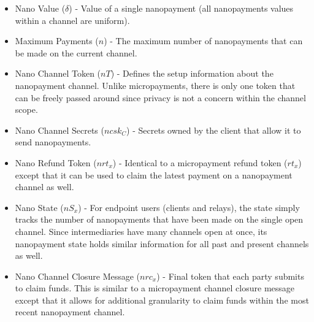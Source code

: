 \documentclass{article}
\begin{document}
\begin{itemize}
\item Nano Value ($\delta$) - Value of a single nanopayment (all
  nanopayments values within a channel are uniform).
\item Maximum Payments ($n$) - The maximum number of nanopayments that
  can be made on the current channel.
\item Nano Channel Token ($nT$) - Defines the setup information about
  the nanopayment channel. Unlike micropayments, there is only one
  token that can be freely passed around since privacy is not a
  concern within the channel scope.
\item Nano Channel Secrets ($ncsk_C$) - Secrets owned by the client
  that allow it to send nanopayments.
\item Nano Refund Token ($nrt_x$) - Identical to a micropayment refund
  token ($rt_x$) except that it can be used to claim the latest
  payment on a nanopayment channel as well.
\item Nano State ($nS_x$) - For endpoint users (clients and relays),
  the state simply tracks the number of nanopayments that have been
  made on the single open channel. Since intermediaries have many
  channels open at once, its nanopayment state holds similar
  information for all past and present channels as well.
\item Nano Channel Closure Message ($nrc_x$) - Final token that each
  party submits to claim funds. This is similar to a micropayment
  channel closure message except that it allows for additional
  granularity to claim funds within the most recent nanopayment
  channel.
\end{itemize}
\end{document}
